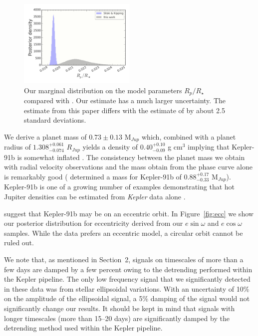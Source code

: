 \documentclass[apjl]{emulateapj}
\begin{document}
 \begin{figure}
\includegraphics[width=0.50\textwidth]{rprs.pdf}
\caption{Our marginal distribution on the model parameters $R_{p}/R_{\star}$ compared with \citet{sliski14}. Our estimate has a much larger uncertainty. The estimate from this paper differs with the estimate of \citet{sliski14} by about 2.5 standard deviations.}
\label{fig:rprs}
\end{figure}


We derive a planet mass of $0.73\pm 0.13$ M$_{Jup}$ which, combined with a planet radius of $1.308^{+0.061}_{-0.074}$ $R_{Jup}$ yields a density of $0.40^{+0.10}_{-0.09}$ g cm$^{3}$ implying that Kepler-91b is somewhat inflated \citep{baraffe10}. The consistency between the planet mass we obtain with radial velocity observations and the mass \citet{lillo14} obtain from the phase curve alone is remarkably good (\citeauthor{lillo14} determined a mass for Kepler-91b of $0.88^{+0.17}_{-0.33}$ M$_{Jup}$). Kepler-91b is one of a growing number of examples demonstrating that hot Jupiter densities can be estimated from \emph{Kepler} data alone \citep[e.g.][]{barclay12,quintana13,esteves13}.

\citet{lillo14} suggest that Kepler-91b may be on an eccentric orbit. In Figure~\ref{fig:ecc} we show our posterior distribution for eccentricity derived from our $e\sin{\omega}$ and $e\cos{\omega}$ samples. While the data prefers an eccentric model, a circular orbit cannot be ruled out.

We note that, as mentioned in Section~2, signals on timescales of more than a few days are damped by a few percent owing to the detrending performed within the Kepler pipeline. The only low frequency signal that we significantly detected in these data was from stellar ellipsoidal variations. With an uncertainty of 10\% on the amplitude of the ellipsoidal signal, a 5\% damping of the signal would not significantly change our results. It should be kept in mind that signals with longer timescales (more than 15--20 days) are significantly damped by the detrending method used within the Kepler pipeline.
\end{document}

